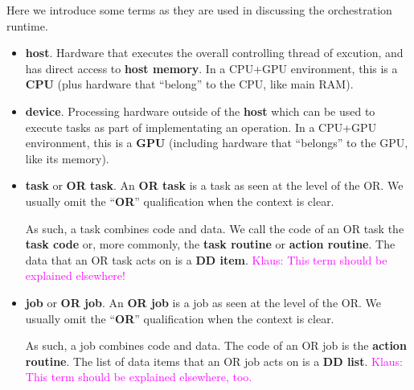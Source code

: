 \documentclass{article}
\newcommand{\Klaus}[1]          {\textcolor{magenta}{Klaus: #1}}
\newcommand{\spelledoutOR}   {orchestration runtime\xspace}
\newcommand{\shortOR}   {OR\xspace}
\newcommand{\OR}        {\shortOR}
\newcommand{\taskroutine}        {task routine\xspace}
\newcommand{\actionroutine}        {action routine\xspace}       %
\begin{document}
Here we introduce some terms as they are used in discussing the \spelledoutOR.
\begin{itemize}
\item \textbf{host}. Hardware that executes the overall controlling thread
   of excution, and has direct access to \textbf{host memory}.
   In a CPU+GPU environment, this is a \textbf{CPU} (plus hardware
   that ``belong'' to the CPU, like main RAM).
\item \textbf{device}. Processing hardware outside of the \textbf{host}
   which can be used to execute tasks as part of implementating
   an operation.
   In a CPU+GPU environment, this is a \textbf{GPU} (including hardware
   that ``belongs'' to the GPU, like its memory).
\item \textbf{task} or \textbf{\shortOR task}.
An \textbf{\shortOR task} is a task as seen at the level of the \OR.
We usually omit the ``\textbf{\shortOR}'' qualification when the context is clear.

As such, a task combines code and data.
We call the code of an \shortOR task the \textbf{task code} or, more commonly, the \textbf{\taskroutine}
or \textbf{\actionroutine}. The data that an \shortOR task acts on is a \textbf{DD item}.
\Klaus{This term should be explained elsewhere!}

\item \textbf{job} or \textbf{\shortOR job}.
An \textbf{\shortOR job} is a job as seen at the level of the \OR.
We usually omit the ``\textbf{\shortOR}'' qualification when the context is clear.

As such, a job combines code and data.
The code of an \shortOR job is the
\textbf{\actionroutine}. The list of data items that an \shortOR job acts on is a \textbf{DD list}.
\Klaus{This term should be explained elsewhere, too.}


\end{itemize}
\end{document}
